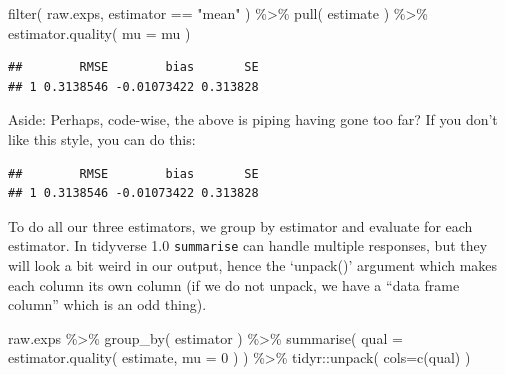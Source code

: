 \documentclass[
]{book}
\newenvironment{Shaded}{\begin{snugshade}}{\end{snugshade}}
\newcommand{\AttributeTok}[1]{\textcolor[rgb]{0.77,0.63,0.00}{#1}}
\newcommand{\DecValTok}[1]{\textcolor[rgb]{0.00,0.00,0.81}{#1}}
\newcommand{\FunctionTok}[1]{\textcolor[rgb]{0.00,0.00,0.00}{#1}}
\newcommand{\NormalTok}[1]{#1}
\newcommand{\SpecialCharTok}[1]{\textcolor[rgb]{0.00,0.00,0.00}{#1}}
\newcommand{\StringTok}[1]{\textcolor[rgb]{0.31,0.60,0.02}{#1}}
\begin{document}
\begin{Shaded}
\begin{Highlighting}[]
\FunctionTok{filter}\NormalTok{( raw.exps, estimator }\SpecialCharTok{==} \StringTok{"mean"}\NormalTok{ ) }\SpecialCharTok{\%\textgreater{}\%}
    \FunctionTok{pull}\NormalTok{( estimate ) }\SpecialCharTok{\%\textgreater{}\%}
    \FunctionTok{estimator.quality}\NormalTok{( }\AttributeTok{mu =}\NormalTok{ mu )}
\end{Highlighting}
\end{Shaded}

\begin{verbatim}
##        RMSE        bias       SE
## 1 0.3138546 -0.01073422 0.313828
\end{verbatim}

Aside: Perhaps, code-wise, the above is piping having gone too far? If you don't like this style, you can do
this:

\begin{Shaded}
\end{Shaded}

\begin{verbatim}
##        RMSE        bias       SE
## 1 0.3138546 -0.01073422 0.313828
\end{verbatim}

To do all our three estimators, we group by estimator and evaluate for each
estimator. In tidyverse 1.0 \texttt{summarise} can handle multiple responses, but they
will look a bit weird in our output, hence the `unpack()' argument which
makes each column its own column (if we do not unpack, we have a ``data frame
column'' which is an odd thing).

\begin{Shaded}
\begin{Highlighting}[]
\NormalTok{raw.exps }\SpecialCharTok{\%\textgreater{}\%}
    \FunctionTok{group\_by}\NormalTok{( estimator ) }\SpecialCharTok{\%\textgreater{}\%}
    \FunctionTok{summarise}\NormalTok{( }\AttributeTok{qual =} \FunctionTok{estimator.quality}\NormalTok{( estimate, }\AttributeTok{mu =} \DecValTok{0}\NormalTok{ ) ) }\SpecialCharTok{\%\textgreater{}\%}
\NormalTok{    tidyr}\SpecialCharTok{::}\FunctionTok{unpack}\NormalTok{( }\AttributeTok{cols=}\FunctionTok{c}\NormalTok{(qual) )}
\end{Highlighting}
\end{Shaded}
\end{document}
